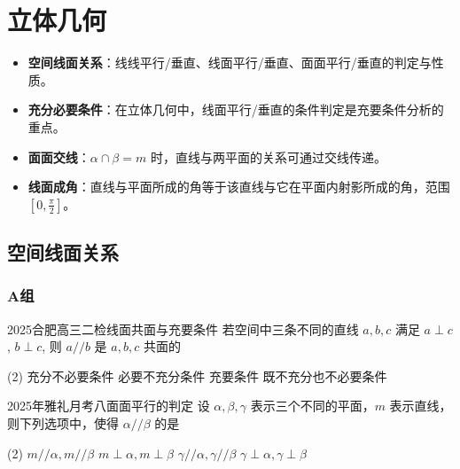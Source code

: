 \chapter{立体几何}
\setcounter{choicecounter}{0}

\begin{knowledgeframe}
\begin{itemize}
	\item \textbf{空间线面关系}：线线平行/垂直、线面平行/垂直、面面平行/垂直的判定与性质。
	\item \textbf{充分必要条件}：在立体几何中，线面平行/垂直的条件判定是充要条件分析的重点。
	\item \textbf{面面交线}：$\alpha\cap\beta=m$ 时，直线与两平面的关系可通过交线传递。
	\item \textbf{线面成角}：直线与平面所成的角等于该直线与它在平面内射影所成的角，范围 $[0,\frac{\pi}{2}]$。
\end{itemize}
\end{knowledgeframe}

\section{空间线面关系}

\startexercise

\subsection*{A组}

\begin{choice}{2025合肥高三二检}{线面共面与充要条件}
	若空间中三条不同的直线 $a, b, c$ 满足 $a \perp c$, $b \perp c$, 则 $a // b$ 是 $a, b, c$ 共面的
	\begin{tasks}(2)
		\task 充分不必要条件
		\task 必要不充分条件
		\task 充要条件
		\task 既不充分也不必要条件
	\end{tasks}
\end{choice}

\begin{choice}{2025年雅礼月考八}{面面平行的判定}
	设 $\alpha, \beta, \gamma$ 表示三个不同的平面，$m$ 表示直线，则下列选项中，使得 $\alpha // \beta$ 的是
	\begin{tasks}(2)
		\task $m // \alpha, m // \beta$
		\task $m \perp \alpha, m \perp \beta$
		\task $\gamma // \alpha, \gamma // \beta$
		\task $\gamma \perp \alpha, \gamma \perp \beta$
	\end{tasks}
\end{choice}

